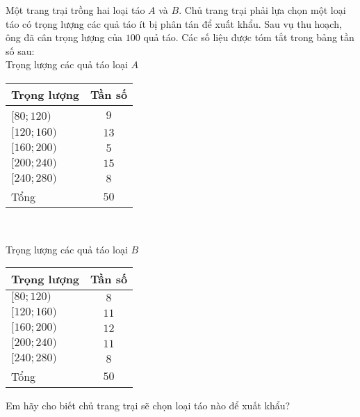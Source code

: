 \begin{bt}%
	Một trang trại trồng hai loại táo $A$ và $B$. Chủ trang trại phải lựa chọn một loại táo có trọng lượng các quả táo ít bị phân tán để xuất khẩu. Sau vụ thu hoạch, ông đã cân trọng lượng của $100$ quả táo. Các số liệu được tóm tắt trong bảng tần số sau:\\
Trọng lượng các quả táo loại $A$
\begin{center}
\begin{tabular}{|l|c|}
	\hline 
	Trọng lượng & Tần số\\ 
	\hline 
		[$80;120)$ & $9$\\ 
	\hline 
		$[120;160)$ & $13$\\ 
	\hline
		$[160;200)$ & $5$\\ 
	\hline
		$[200;240)$ & $15$\\ 
	\hline
		$[240;280)$ & $8$\\ 
	\hline
		Tổng & $50$\\ 
	\hline
\end{tabular}\\
\end{center}
Trọng lượng các quả táo loại $B$
\begin{center}
\begin{tabular}{|l|c|}
	\hline 
	Trọng lượng & Tần số\\ 
	\hline 
	$[80;120)$ & $8$\\ 
	\hline 
	$[120;160)$ & $11$\\ 
	\hline
	$[160;200)$ & $12$\\ 
	\hline
	$[200;240)$ & $11$\\ 
	\hline
	$[240;280)$ & $8$\\ 
	\hline
	Tổng & $50$\\ 
	\hline
\end{tabular}
\end{center}
Em hãy cho biết chủ trang trại sẽ chọn loại táo nào để xuất khẩu?
\end{bt}

